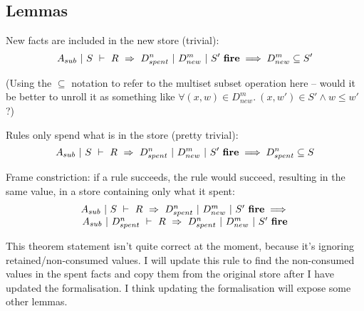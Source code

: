 \subsection{Lemmas}

\begin{lemma}
New facts are included in the new store (trivial):
$$
A_{sub}~|~S~\vdash~R~\Rightarrow~D_{spent}^n~|~D_{new}^m~|~S'~\textbf{fire}
\implies
D_{new}^m \subseteq S'
$$
\end{lemma}
(Using the $\subseteq$ notation to refer to the multiset subset operation here -- would it be better to unroll it as something like $\forall (x,w) \in D_{new}^m.\ (x,w') \in S' \wedge w \le w'$ ?)

\begin{lemma}
Rules only spend what is in the store (pretty trivial):
$$
A_{sub}~|~S~\vdash~R~\Rightarrow~D_{spent}^n~|~D_{new}^m~|~S'~\textbf{fire}
\implies
D_{spent}^n \subseteq S
$$
\end{lemma}

\begin{theorem}
Frame constriction: if a rule succeeds, the rule would succeed, resulting in the same value, in a store containing only what it spent:
$$
\begin{array}{c}
A_{sub}~|~S~\vdash~R~\Rightarrow~D_{spent}^n~|~D_{new}^m~|~S'~\textbf{fire}
\implies \\
A_{sub}~|~D_{spent}^n~\vdash~R~\Rightarrow~D_{spent}^n~|~D_{new}^m~|~S'~\textbf{fire}
\end{array}
$$
\end{theorem}
This theorem statement isn't quite correct at the moment, because it's ignoring retained/non-consumed values. I will update this rule to find the non-consumed values in the spent facts and copy them from the original store after I have updated the formalisation. I think updating the formalisation will expose some other lemmas.



